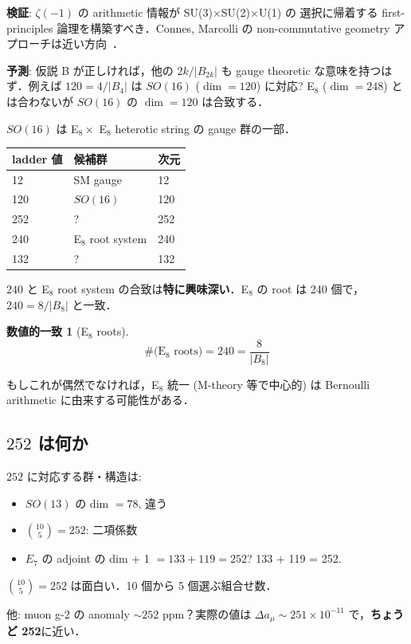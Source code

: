 \documentclass[11pt,a4paper]{article}
\newtheorem{coincidence}{数値的一致}
\begin{document}
\textbf{検証}: $\zeta(-1)$ の arithmetic 情報が SU(3)×SU(2)×U(1) の
選択に帰着する first-principles 論理を構築すべき．Connes, Marcolli の
non-commutative geometry アプローチは近い方向~\cite{ConnesMarcolli}．

\textbf{予測}: 仮説 B が正しければ，他の $2k/|B_{2k}|$ も gauge
theoretic な意味を持つはず．例えば $120 = 4/|B_4|$ は $SO(16)$
($\dim = 120$) に対応? E$_8$ ($\dim = 248$) とは合わないが $SO(16)$ の
$\dim = 120$ は合致する．

$SO(16)$ は E$_8 \times$ E$_8$ heterotic string の gauge 群の一部．

\begin{center}
\begin{tabular}{lll}
\toprule
ladder 値 & 候補群 & 次元 \\
\midrule
12 & SM gauge & 12 \\
120 & $SO(16)$ & 120 \\
252 & ? & 252 \\
240 & E$_8$ root system & 240 \\
132 & ? & 132 \\
\bottomrule
\end{tabular}
\end{center}

$240$ と E$_8$ root system の合致は\textbf{特に興味深い}．E$_8$ の
root は 240 個で，$240 = 8/|B_8|$ と一致．

\begin{coincidence}[E$_8$ roots]
$$\text{\#(E$_8$ roots)} = 240 = \frac{8}{|B_8|}$$
\end{coincidence}

もしこれが偶然でなければ，E$_8$ 統一 (M-theory 等で中心的) は
Bernoulli arithmetic に由来する可能性がある．

\subsection{$252$ は何か}

$252$ に対応する群・構造は:
\begin{itemize}
\item $SO(13)$ の dim $= 78$, 違う
\item $\binom{10}{5} = 252$: 二項係数
\item $E_7$ の adjoint の dim + 1 $= 133 + 119 = 252$? 133 + 119 = 252.
\end{itemize}

$\binom{10}{5} = 252$ は面白い．10 個から 5 個選ぶ組合せ数．

他: muon g-2 の anomaly $\sim 252$ ppm？実際の値は $\Delta a_\mu \sim 251 \times 10^{-11}$ で，\textbf{ちょうど 252}に近い．
\end{document}
